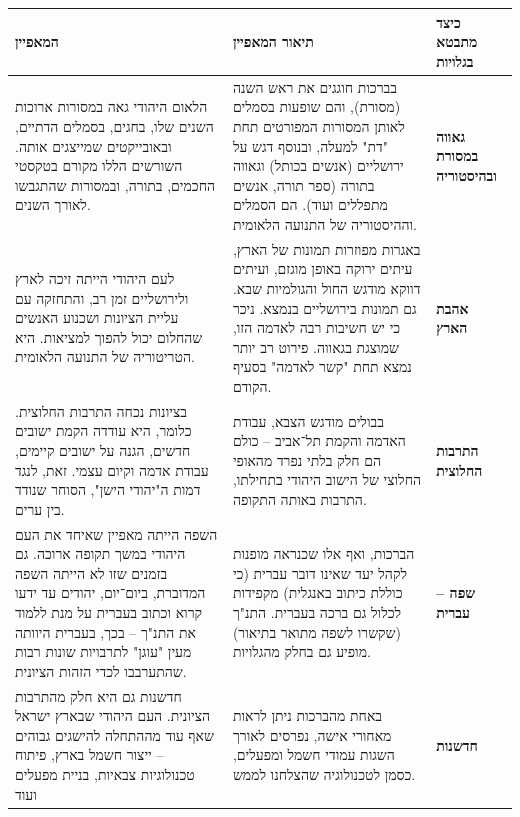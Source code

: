 \documentclass[]{article}
\begin{document}
	\section{}
	\begin{center}
		\begin{tabularx}{\textwidth}{|X|X|l|}
			\hline \hfil \textbf{המאפיין} \hfil & \hfil \textbf{תיאור המאפיין} \hfil & \hfil \textbf{כיצד מתבטא בגלויות}  \\
			\hline 
			הלאום היהודי גאה במסורות ארוכות השנים שלו, בחגים, בסמלים הדתיים, ובאובייקטים שמייצגים אותה. השורשים הללו מקורם בטקסטי החכמים, בתורה, ובמסורות שהתגבשו לאורך השנים. &
			בברכות חוגגים את ראש השנה (מסורת), והם שופעות בסמלים לאותן המסורות המפורטים תחת "דת" למעלה, ובנוסף דגש על ירושליים (אנשים בכותל) וגאווה בתורה (ספר תורה, אנשים מתפללים ועוד). הם הסמלים וההיסטוריה של התנועה הלאומית. & 
			
		 \hfil \textbf{גאווה במסורת ובהיסטוריה} \hfil \\
		 \hline 
			לעם היהודי הייתה זיכה לארץ ולירושליים זמן רב, והתחזקה עם עליית הציונות ושכנוע האנשים שהחלום יכול להפוך למציאות. היא הטריטוריה של התנועה הלאומית. & באגרות מפוזרות תמונות של הארץ, עיתים ירוקה באופן מוגזם, ועיתים דווקא מודגש החול והגולמיות שבא. גם תמונות בירושליים בנמצא. ניכר כי יש חשיבות רבה לאדמה הזו, שמוצגת בגאווה. פירוט רב יותר נמצא תחת "קשר לאדמה" בסעיף הקודם. &  \hfil \textbf{אהבת הארץ} \hfil \\
			\hline 
			בציונות נכחה התרבות החלוצית. כלומר, היא עודדה הקמת ישובים חדשים, הגנה על ישובים קיימים, עבודת אדמה וקיום עצמי. זאת, לנגד דמות ה"יהודי הישן", הסוחר שנודד בין ערים. & בבולים מודגש הצבא, עבודת האדמה והקמת תל־אביב – כולם הם חלק בלתי נפרד מהאופי החלוצי של הישוב היהודי בתחילתו, התרבות באותה התקופה. &  \hfil \textbf{התרבות החלוצית} \hfil \\
			\hline 
			השפה הייתה מאפיין שאיחד את העם היהודי במשך תקופה ארוכה. גם בזמנים שזו לא הייתה השפה המדוברת, ביום־יום, יהודים עד ידעו קרוא וכתוב בעברית על מנת ללמוד את התנ"ך – בכך, בעברית היוותה מעין "עוגן" לתרבויות שונות רבות שהתערבבו לכדי הזהות הציונית. & הברכות, ואף אלו שכנראה מופנות לקהל יעד שאינו דובר עברית (כי כוללת כיתוב באנגלית) מקפידות לכלול גם ברכה בעברית. התנ"ך (שקשרו לשפה מתואר בתיאור) מופיע גם בחלק מהגלויות. &  \hfil \textbf{שפה – עברית}  \hfil \\
			\hline 
			חדשנות גם היא חלק מהתרבות הציונית. העם היהודי שבארץ ישראל שאף עוד מההתחלה להישגים גבוהים – ייצור חשמל בארץ, פיתוח טכנולוגיות צבאיות, בניית מפעלים ועוד & באחת מהברכות ניתן לראות מאחורי אישה, נפרסים לאורך השגות עמודי חשמל ומפעלים, כסמן לטכנולוגיה שהצלחנו לממש. &  \hfil \textbf{חדשנות} \hfil \\
			\hline
		\end{tabularx}
	\end{center}
	
\end{document}
